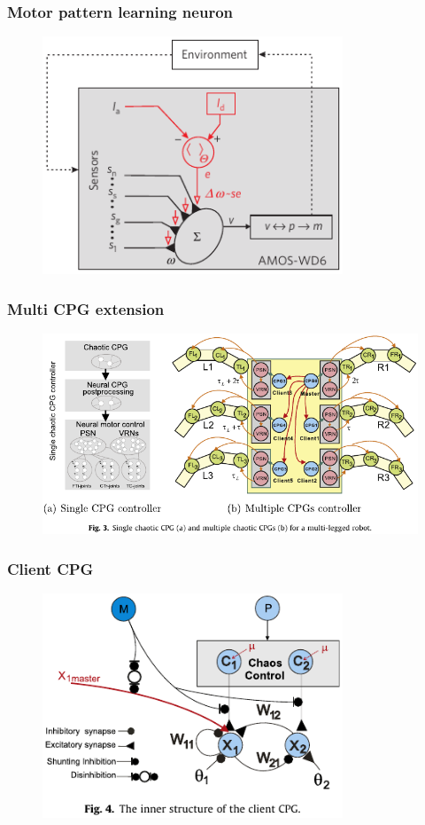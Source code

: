\documentclass{beamer}
\begin{document}
\begin{frame}
\frametitle{Motor pattern learning neuron}
\begin{figure}
\center
\includegraphics[width=0.8\textwidth]{figs/motor-pattern-learning.pdf}
\end{figure}
\end{frame}

\begin{frame}
\frametitle{Multi CPG extension}
\begin{figure}
\center
\includegraphics[width=1\textwidth]{figs/multi-CPG-extension.pdf}
\end{figure}
\end{frame}

\begin{frame}
\frametitle{Client CPG}
\begin{figure}
\center
\includegraphics[width=0.8\textwidth]{figs/client-CPG.pdf}
\end{figure}
\end{frame}
\end{document}
